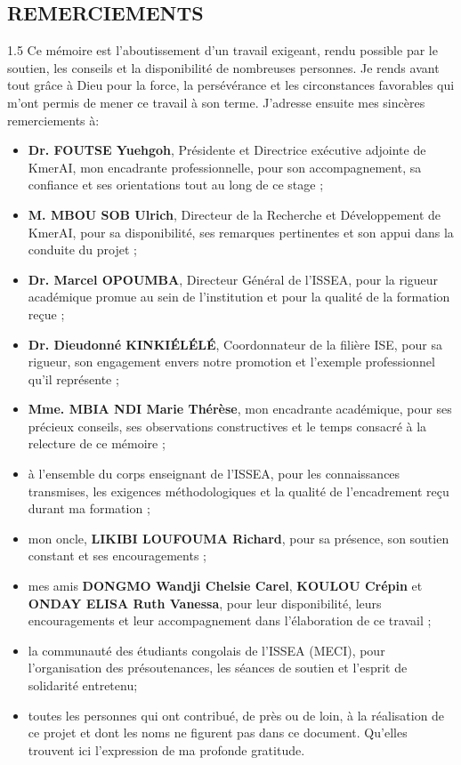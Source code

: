\documentclass[12pt,twoside]{report}
\begin{document}
\begin{singlespace}
\chapter*{REMERCIEMENTS}
\begin{spacing}{1.5}
Ce mémoire est l'aboutissement d'un travail exigeant, rendu possible par le soutien, les conseils et la disponibilité de nombreuses personnes. Je rends avant tout grâce à Dieu pour la force, la persévérance et les circonstances favorables qui m'ont permis de mener ce travail à son terme. J'adresse ensuite mes sincères remerciements à:
\begin{itemize}
	\item \textbf{Dr. FOUTSE Yuehgoh}, Présidente et Directrice exécutive adjointe de KmerAI, mon encadrante professionnelle, pour son accompagnement, sa confiance et ses orientations tout au long de ce stage ;
	\item \textbf{M. MBOU SOB Ulrich}, Directeur de la Recherche et Développement de KmerAI, pour sa disponibilité, ses remarques pertinentes et son appui dans la conduite du projet ;
	\item \textbf{Dr. Marcel OPOUMBA}, Directeur Général de l'ISSEA, pour la rigueur académique promue au sein de l'institution et pour la qualité de la formation reçue ;
	\item \textbf{Dr. Dieudonné KINKIÉLÉLÉ}, Coordonnateur de la filière ISE, pour sa rigueur, son engagement envers notre promotion et l'exemple professionnel qu'il représente ;
	\item \textbf{Mme. MBIA NDI Marie Thérèse}, mon encadrante académique, pour ses précieux conseils, ses observations constructives et le temps consacré à la relecture de ce mémoire ;
	\item à l'ensemble du corps enseignant de l'ISSEA, pour les connaissances transmises, les exigences méthodologiques et la qualité de l'encadrement reçu durant ma formation ;
	\item mon oncle, \textbf{LIKIBI LOUFOUMA Richard}, pour sa présence, son soutien constant et ses encouragements ;
	\item mes amis \textbf{DONGMO Wandji Chelsie Carel}, \textbf{KOULOU Crépin} et \textbf{ONDAY ELISA Ruth Vanessa}, pour leur disponibilité, leurs encouragements et leur accompagnement dans l'élaboration de ce travail ;
	\item la communauté des étudiants congolais de l'ISSEA (MECI), pour l'organisation des présoutenances, les séances de soutien et l'esprit de solidarité entretenu;%
	\item toutes les personnes qui ont contribué, de près ou de loin, à la réalisation de ce projet et dont les noms ne figurent pas dans ce document. Qu'elles trouvent ici l'expression de ma profonde gratitude.
\end{itemize}
\end{spacing}



\end{singlespace}
\end{document}
